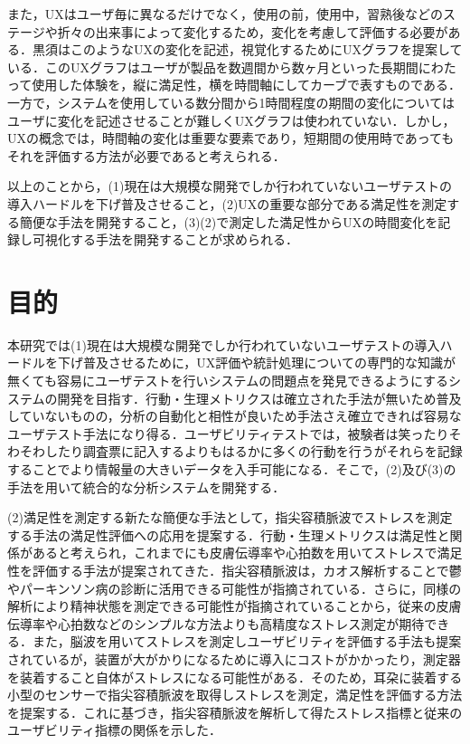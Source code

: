 また，UXはユーザ毎に異なるだけでなく，使用の前，使用中，習熟後などのステージや折々の出来事によって変化するため，変化を考慮して評価する必要がある\cite{kurosu}．黒須はこのようなUXの変化を記述，視覚化するためにUXグラフ\cite{kurosu2015}を提案している．このUXグラフはユーザが製品を数週間から数ヶ月といった長期間にわたって使用した体験を，縦に満足性，横を時間軸にしてカーブで表すものである．一方で，システムを使用している数分間から1時間程度の期間の変化についてはユーザに変化を記述させることが難しくUXグラフは使われていない．しかし，UXの概念では，時間軸の変化は重要な要素であり，短期間の使用時であってもそれを評価する方法が必要であると考えられる．

以上のことから，(1)現在は大規模な開発でしか行われていないユーザテストの導入ハードルを下げ普及させること，(2)UXの重要な部分である満足性を測定する簡便な手法を開発すること，(3)(2)で測定した満足性からUXの時間変化を記録し可視化する手法を開発することが求められる．

\section{目的}

本研究では(1)現在は大規模な開発でしか行われていないユーザテストの導入ハードルを下げ普及させるために，UX評価や統計処理についての専門的な知識が無くても容易にユーザテストを行いシステムの問題点を発見できるようにするシステムの開発を目指す．行動・生理メトリクスは確立された手法が無いため普及していないものの，分析の自動化と相性が良いため手法さえ確立できれば容易なユーザテスト手法になり得る．ユーザビリティテストでは，被験者は笑ったりそわそわしたり調査票に記入するよりもはるかに多くの行動を行うがそれらを記録することでより情報量の大きいデータを入手可能になる\cite{tullis2014}．そこで，(2)及び(3)の手法を用いて統合的な分析システムを開発する．

(2)満足性を測定する新たな簡便な手法として，指尖容積脈波でストレスを測定する手法の満足性評価への応用を提案する．行動・生理メトリクスは満足性と関係があると考えられ，これまでにも皮膚伝導率や心拍数を用いてストレスで満足性を評価する手法が提案されてきた．指尖容積脈波は，カオス解析することで鬱やパーキンソン病の診断に活用できる可能性が指摘されている\cite{tuan}\cite{oyama}．さらに，同様の解析により精神状態を測定できる可能性\cite{arai}が指摘されていることから，従来の皮膚伝導率や心拍数などのシンプルな方法よりも高精度なストレス測定が期待できる．また，脳波を用いてストレスを測定しユーザビリティを評価する手法\cite{amaral}も提案されているが，装置が大がかりになるために導入にコストがかかったり，測定器を装着すること自体がストレスになる可能性がある．そのため，耳朶に装着する小型のセンサーで指尖容積脈波を取得しストレスを測定，満足性を評価する方法を提案する．これに基づき，指尖容積脈波を解析して得たストレス指標と従来のユーザビリティ指標の関係を示した．

